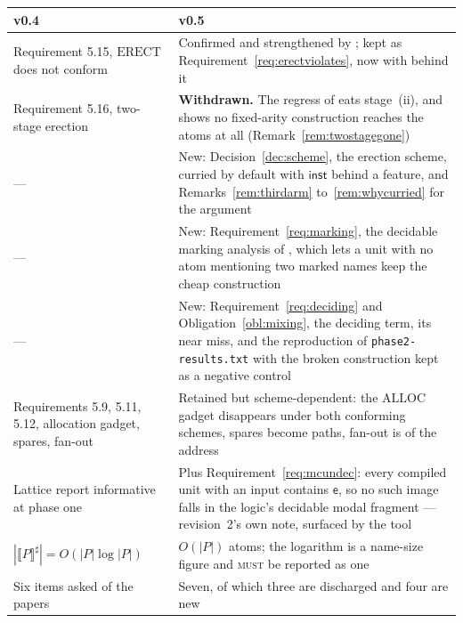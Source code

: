 \documentclass[11pt,a4paper]{article}
\newcommand{\code}[1]{\texttt{#1}}
\newcommand{\MUST}{\textsc{must}}
\newcommand{\enc}[1]{\llbracket #1 \rrbracket}
\newcommand{\ev}{\mathsf{e}}
\newcommand{\ALLOC}{\mathrm{ALLOC}}
\newcommand{\ERECT}{\mathrm{ERECT}}
\newcommand{\inst}{\mathsf{inst}}
\theoremstyle{definition}
\theoremstyle{plain}
\begin{document}
\begin{center}
\begin{tabularx}{\linewidth}{@{}l>{\raggedright\arraybackslash}X@{}}
\toprule
v0.4 & v0.5\\
\midrule
Requirement 5.15, $\ERECT$ does not conform & Confirmed and strengthened by
\cite[\S6.6]{draft3}; kept as Requirement~\ref{req:erectviolates}, now with
\cite[Ex.~6.16]{draft3} behind it\\
Requirement 5.16, two-stage erection & \textbf{Withdrawn.} The regress of
\cite[\S6.6]{draft3} eats stage~(ii), and
\cite[Prop.~6.17]{draft3} shows no fixed-arity construction reaches the atoms
at all (Remark~\ref{rem:twostagegone})\\
--- & New: Decision~\ref{dec:scheme}, the erection scheme, curried by default
with $\inst$ behind a feature, and Remarks~\ref{rem:thirdarm}
to~\ref{rem:whycurried} for the argument\\
--- & New: Requirement~\ref{req:marking}, the decidable marking analysis of
\cite[Rem.~6.20]{draft3}, which lets a unit with no atom mentioning two marked
names keep the cheap construction\\
--- & New: Requirement~\ref{req:deciding} and
Obligation~\ref{obl:mixing}, the deciding term, its near miss, and the
reproduction of \code{phase2-results.txt} with the broken construction kept as
a negative control\\
Requirements 5.9, 5.11, 5.12, allocation gadget, spares, fan-out & Retained
but scheme-dependent: the $\ALLOC$ gadget disappears under both conforming
schemes, spares become paths, fan-out is of the address\\
Lattice report informative at phase one & Plus
Requirement~\ref{req:mcundec}: every compiled unit with an input contains
$\ev$, so no such image falls in the logic's decidable modal fragment ---
\cite{logic} revision~2's own note, surfaced by the tool\\
$|\enc{P}^{\sharp}| = O(|P|\log|P|)$ & $O(|P|)$ atoms; the logarithm is a
name-size figure and \MUST{} be reported as one\\
Six items asked of the papers & Seven, of which three are discharged and four
are new\\
\bottomrule
\end{tabularx}
\end{center}
\end{document}
